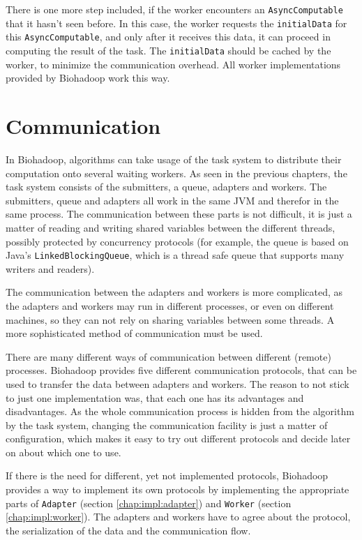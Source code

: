   There is one more step included, if the worker encounters an \texttt{AsyncComputable} that it hasn't seen before. In this case, the worker requests the \texttt{initialData} for this \texttt{AsyncComputable}, and only after it receives this data, it can proceed in computing the result of the task. The \texttt{initialData} should be cached by the worker, to minimize the communication overhead. All worker implementations provided by Biohadoop work this way.
  
\section{Communication}
\label{chap:impl:communication}
  In Biohadoop, algorithms can take usage of the task system to distribute their computation onto several waiting workers. As seen in the previous chapters, the task system consists of the submitters, a queue, adapters and workers. The submitters, queue and adapters all work in the same JVM and therefor in the same process. The communication between these parts is not difficult, it is just a matter of reading and writing shared variables between the different threads, possibly protected by concurrency protocols (for example, the queue is based on Java's \texttt{LinkedBlockingQueue}, which is a thread safe queue that supports many writers and readers).
  
  The communication between the adapters and workers is more complicated, as the adapters and workers may run in different processes, or even on different machines, so they can not rely on sharing variables between some threads. A more sophisticated method of communication must be used.
  
  There are many different ways of communication between different (remote) processes. Biohadoop provides five different communication protocols, that can be used to transfer the data between adapters and workers. The reason to not stick to just one implementation was, that each one has its advantages and disadvantages. As the whole communication process is hidden from the algorithm by the task system, changing the communication facility is just a matter of configuration, which makes it easy to try out different protocols and decide later on about which one to use.
  
  If there is the need for different, yet not implemented protocols, Biohadoop provides a way to implement its own protocols by implementing the appropriate parts of \texttt{Adapter} (section \ref{chap:impl:adapter}) and \texttt{Worker} (section \ref{chap:impl:worker}). The adapters and workers have to agree about the protocol, the serialization of the data and the communication flow.
  
